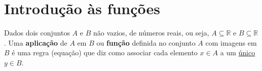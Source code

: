

\chapter{Introdução às funções}

\vskip0.1cm
 \colorbox{azul}{
 \begin{minipage}{0.9\linewidth}
 \begin{center}
  Dados dois conjuntos $A$ e $B$ não vazios, de números reais, ou seja, $A \subseteq \mathbb{R}$ e $B \subseteq \mathbb{R}$. Uma \textbf{aplicação} de $A$ em $B$ ou \textbf{função} definida no conjunto $A$ com imagens em $B$ é uma regra (equação) que diz como associar cada elemento $x \in A$ a um \underline{único} $y \in B$.
 \end{center}
 \end{minipage}}
 \vskip0.1cm


